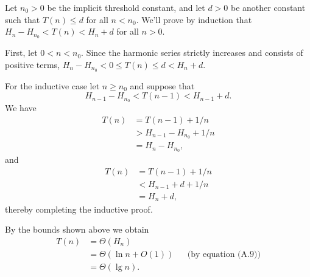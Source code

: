 Let $n_0>0$ be the implicit threshold constant, and let $d>0$ be another constant such that $T(n)\le d$ for all $n<n_0$.
We'll prove by induction that $H_n-H_{n_0}<T(n)<H_n+d$ for all $n>0$.

First, let $0<n<n_0$.
Since the harmonic series strictly increases and consists of positive terms, $H_n-H_{n_0}<0\le T(n)\le d<H_n+d$.

For the inductive case let $n\ge n_0$ and suppose that
\[
    H_{n-1}-H_{n_0} < T(n-1) < H_{n-1}+d.
\]
We have
\begin{align*}
    T(n) &= T(n-1)+1/n \\
    &> H_{n-1}-H_{n_0}+1/n \\
    &= H_n-H_{n_0},
\end{align*}
and
\begin{align*}
    T(n) &= T(n-1)+1/n \\
    &< H_{n-1}+d+1/n \\
    &= H_n+d,
\end{align*}
thereby completing the inductive proof.

By the bounds shown above we obtain
\begin{align*}
    T(n) &= \Theta(H_n) \\
    &= \Theta(\ln n+O(1)) && \text{(by equation (A.9))} \\
    &= \Theta(\lg n).
\end{align*}
